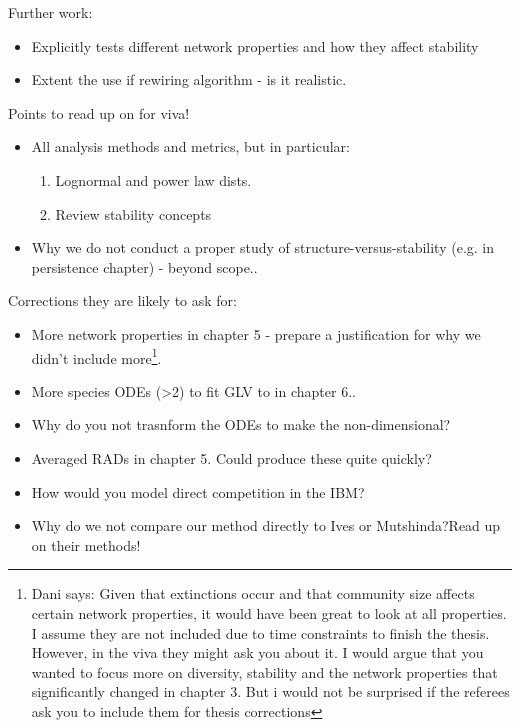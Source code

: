 Further work:
\begin{itemize}
	\item Explicitly tests different network properties and how they affect stability 
	\item Extent the use if rewiring algorithm - is it realistic.
\end{itemize}

Points to read up on for viva!

\begin{itemize}
	\item All analysis methods and metrics, but in particular:
	\begin{enumerate}
		\item Lognormal and power law dists. \cite{mcgill2007species}
		\item Review stability concepts \cite{donohue2013dimensionality}
	\end{enumerate}		
	
	\item Why we do not conduct a proper study of structure-versus-stability (e.g. in persistence chapter) - beyond scope..
\end{itemize}


Corrections they are likely to ask for:

\begin{itemize}
	\item More network properties in chapter 5 - prepare a justification for why we didn't include more\footnote{Dani says: Given that extinctions occur and that community size affects certain network properties, it would have been great to look at all properties. I assume they are not included due to time constraints to finish the thesis. However, in the viva they might ask you about it. I would argue that you wanted to focus more on diversity, stability and the network properties that significantly changed in chapter 3. But i would not be surprised if the referees ask you to include them for thesis corrections}.
	\item More species ODEs (>2) to fit GLV to in chapter 6..
	\item Why do you not trasnform the ODEs to make the non-dimensional?
	\item Averaged RADs in chapter 5. Could produce these quite quickly?
	\item How would you model direct competition in the IBM?
	\item Why do we not compare our method directly to Ives or Mutshinda?Read up on their methods!
\end{itemize}